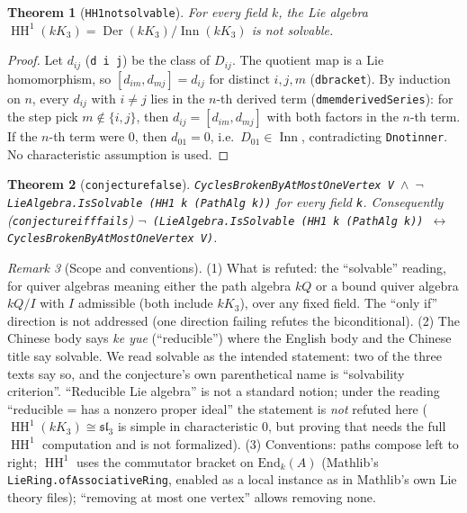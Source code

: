 \documentclass[11pt]{article}
\renewcommand{\_}{\oldus\allowbreak}
\newtheorem{theorem}{Theorem}
\theoremstyle{definition}
\theoremstyle{remark}
\newtheorem{remark}[theorem]{Remark}
\newcommand{\Der}{\operatorname{Der}}
\newcommand{\Inn}{\operatorname{Inn}}
\newcommand{\HH}{\operatorname{HH}}
\newcommand{\lean}[1]{\texttt{#1}}
\begin{document}
\begin{theorem}[\lean{HH1\_not\_solvable}]
For every field $k$, the Lie algebra $\HH^1(kK_3) = \Der(kK_3)/\Inn(kK_3)$ is not solvable.
\end{theorem}
\begin{proof}
Let $d_{ij}$ (\lean{d i j}) be the class of $D_{ij}$. The quotient map is a Lie homomorphism, so
$[d_{im}, d_{mj}] = d_{ij}$ for distinct $i,j,m$ (\lean{d\_bracket}). By induction on $n$, every
$d_{ij}$ with $i\ne j$ lies in the $n$-th derived term (\lean{d\_mem\_derivedSeries}): for the
step pick $m \notin \{i,j\}$, then $d_{ij} = [d_{im}, d_{mj}]$ with both factors in the $n$-th term.
If the $n$-th term were $0$, then $d_{01} = 0$, i.e.\ $D_{01} \in \Inn$, contradicting
\lean{D\_not\_inner}. No characteristic assumption is used.
\end{proof}

\begin{theorem}[\lean{conjecture\_00000004044\_false}]
\lean{CyclesBrokenByAtMostOneVertex V $\wedge$ $\neg$ LieAlgebra.IsSolvable (HH1 k (PathAlg k))}
for every field \lean{k}. Consequently (\lean{conjecture\_00000004044\_iff\_fails})
\lean{$\neg$ (LieAlgebra.IsSolvable (HH1 k (PathAlg k)) $\leftrightarrow$
CyclesBrokenByAtMostOneVertex V)}.
\end{theorem}

\begin{remark}[Scope and conventions]\label{rem:reading}
(1) What is refuted: the ``solvable'' reading, for quiver algebras meaning either the path algebra
$kQ$ or a bound quiver algebra $kQ/I$ with $I$ admissible (both include $kK_3$), over any fixed
field. The ``only if'' direction is not addressed (one direction failing refutes the biconditional).
(2) The Chinese body says \emph{ke yue} (``reducible'') where the English body and the Chinese
title say solvable. We read solvable as the intended statement: two of the three texts say so, and
the conjecture's own parenthetical name is ``solvability criterion''. ``Reducible Lie algebra''
is not a standard notion; under the reading ``reducible = has a nonzero proper ideal'' the
statement is \emph{not} refuted here ($\HH^1(kK_3) \cong \mathfrak{sl}_3$ is simple in
characteristic $0$, but proving that needs the full $\HH^1$ computation and is not formalized).
(3) Conventions: paths compose left to right; $\HH^1$ uses the commutator bracket on
$\mathrm{End}_k(A)$ (Mathlib's \lean{LieRing.ofAssociativeRing}, enabled as a local instance as in
Mathlib's own Lie theory files); ``removing at most one vertex'' allows removing none.
\end{remark}
\end{document}
